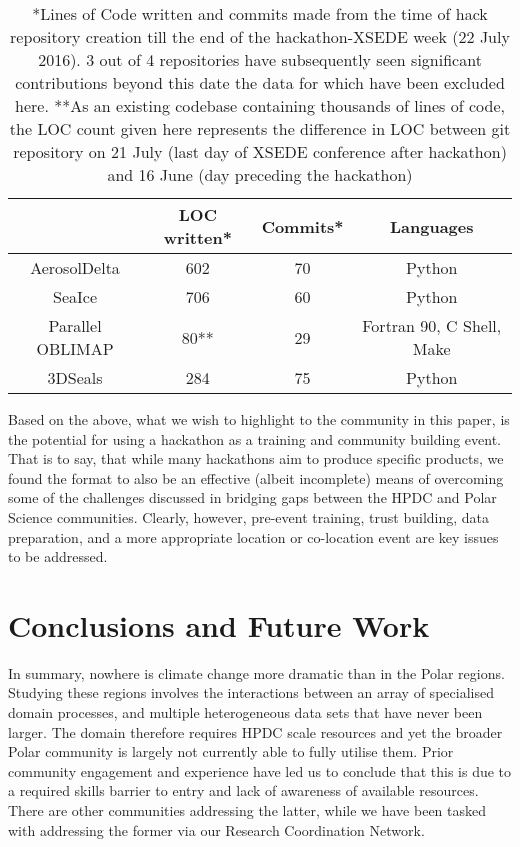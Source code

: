 \documentclass[conference]{IEEEtran}
\begin{document}
\begin{table}[!h]
\centering
\renewcommand{\arraystretch}{1.3}
\begin{tabular}{|c|c|c|c|}
\hline
&LOC written* & Commits* & Languages\\
\hline
AerosolDelta & 602 & 70 & Python\\
\hline
SeaIce & 706 & 60 & Python\\
\hline
Parallel OBLIMAP & 80** & 29 & Fortran 90, C Shell, Make\\
\hline
3DSeals & 284 & 75 & Python\\
\hline
\end{tabular}
\caption{*Lines of Code written and commits made from the time of hack repository creation till the end of the hackathon-XSEDE week (22 July 2016).  3 out of 4 repositories have subsequently seen significant contributions beyond this date the data for which have been excluded here.
**As an existing codebase containing thousands of lines of code, the LOC count given here represents the difference in LOC between git repository on 21 July (last day of XSEDE conference after hackathon) and 16 June (day preceding the hackathon)}
\label{stats}
\end{table}

Based on the above, what we wish to highlight to the community in this paper, is the potential for using a hackathon as a training and community building event.  That is to say, that while many hackathons aim to produce specific products, we found the format to also be an effective (albeit incomplete) means of overcoming some of the challenges discussed in bridging gaps between the HPDC and Polar Science communities.  Clearly, however, pre-event training, trust building, data preparation, and a more appropriate location or co-location event are key issues to be addressed. 

\section{Conclusions and Future Work}
In summary, nowhere is climate change more dramatic than in the Polar regions.  Studying these regions involves the interactions between an array of specialised domain processes, and multiple heterogeneous data sets that have never been larger.  The domain therefore requires HPDC scale resources and yet the broader Polar community is largely not currently able to fully utilise them.  Prior community engagement and experience have led us to conclude that this is due to a required skills barrier to entry and lack of awareness of available resources.  There are other communities addressing the latter, while we have been tasked with addressing the former via our Research Coordination Network.
\end{document}
